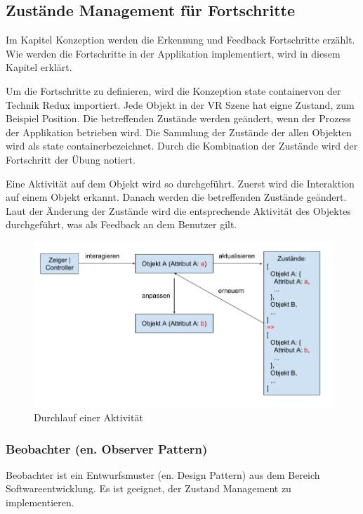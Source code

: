  \subsection{Zustände Management für Fortschritte}
 Im Kapitel Konzeption werden die Erkennung und Feedback Fortschritte erzählt. Wie werden die Fortschritte in der Applikation implementiert, wird in diesem Kapitel erklärt.
 
 Um die Fortschritte zu definieren, wird die Konzeption \glqq state container\grqq von der Technik Redux importiert. Jede Objekt in der VR Szene hat eigne Zustand, zum Beispiel Position. Die betreffenden Zustände werden geändert, wenn der Prozess der Applikation betrieben wird. Die Sammlung der Zustände der allen Objekten wird als \glqq state container\grqq bezeichnet. Durch die Kombination der Zustände wird der Fortschritt der Übung notiert.
 
 Eine Aktivität auf dem Objekt wird so durchgeführt. Zuerst wird die Interaktion auf einem Objekt erkannt. Danach werden die betreffenden Zustände geändert. Laut der Änderung der Zustände wird die entsprechende Aktivität des Objektes durchgeführt, was als Feedback an dem Benutzer gilt.
 
\begin{figure}[ht]
\centering
\includegraphics[width=\textwidth]{images/interaktionVerlauf.png}
\caption[Durchlauf einer Aktivität]{Durchlauf einer Aktivität}
\label{fig:interaktionVerlauf} 
\end{figure}
 
  \subsubsection{Beobachter (en. Observer Pattern)}
  Beobachter ist ein Entwurfsmuster (en. Design Pattern) aus dem Bereich Softwareentwicklung. Es ist geeignet, der Zustand Management zu implementieren.
  
